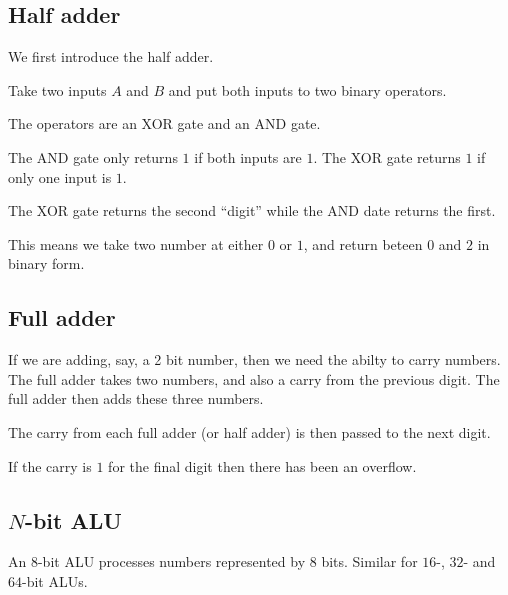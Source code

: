 
\subsection{Half adder}

We first introduce the half adder.

Take two inputs \(A\) and \(B\) and put both inputs to two binary operators.

The operators are an XOR gate and an AND gate.

The AND gate only returns \(1\) if both inputs are \(1\). The XOR gate returns \(1\) if only one input is \(1\).

The XOR gate returns the second “digit” while the AND date returns the first.

This means we take two number at either \(0\) or \(1\), and return beteen \(0\) and \(2\) in binary form.

\subsection{Full adder}

If we are adding, say, a 2 bit number, then we need the abilty to carry numbers. The full adder takes two numbers, and also a carry from the previous digit. The full adder then adds these three numbers.

The carry from each full adder (or half adder) is then passed to the next digit.

If the carry is \(1\) for the final digit then there has been an overflow.

\subsection{\(N\)-bit ALU}

An \(8\)-bit ALU processes numbers represented by \(8\) bits. Similar for \(16\)-, \(32\)- and \(64\)-bit ALUs.
